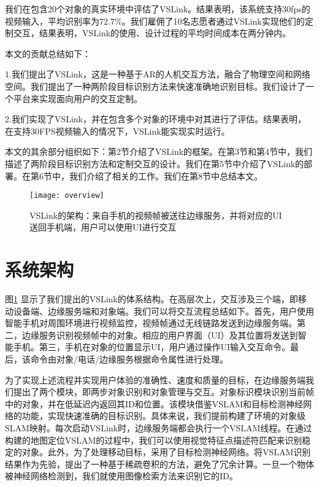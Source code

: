 我们在包含20个对象的真实环境中评估了VSLink。结果表明，该系统支持30fps的视频输入，平均识别率为72.7\%。我们雇佣了10名志愿者通过VSLink实现他们的定制交互，结果表明，VSLink的使用、设计过程的平均时间成本在两分钟内。

本文的贡献总结如下：

1.我们提出了VSLink，这是一种基于AR的人机交互方法，融合了物理空间和网络空间。我们提出了一种两阶段目标识别方法来快速准确地识别目标。我们设计了一个平台来实现面向用户的交互定制。

2.我们实现了VSLink，并在包含多个对象的环境中对其进行了评估。结果表明，在支持30FPS视频输入的情况下，VSLink能实现实时运行。

本文的其余部分组织如下：第2节介绍了VSLink的框架。在第3节和第4节中，我们描述了两阶段目标识别方法和定制交互的设计。我们在第5节中介绍了VSLink的部署。在第6节中，我们介绍了相关的工作。我们在第8节中总结本文。

\begin{figure}[t]
	\centering
	\texttt{[image: overview]}
	\caption{VSLink的架构：来自手机的视频帧被送往边缘服务，并将对应的UI送回手机端，用户可以使用UI进行交互}
	\label{fig:overview}
\end{figure}

\chapter{系统架构}


图\ref{fig:overview} 显示了我们提出的VSLink的体系结构。在高层次上，交互涉及三个端，即移动设备端、边缘服务端和对象端。我们可以将交互流程总结如下。首先，用户使用智能手机对周围环境进行视频监控，视频帧通过无线链路发送到边缘服务端。第二，边缘服务识别视频帧中的对象。相应的用户界面（UI）及其位置将发送到智能手机。第三，手机在对象的位置显示UI，用户通过操作UI输入交互命令。最后，该命令由对象/电话/边缘服务根据命令属性进行处理。

为了实现上述流程并实现用户体验的准确性、速度和质量的目标，在边缘服务端我们提出了两个模块，即两步对象识别和对象管理与交互。对象标识模块识别当前帧中的对象，并在低延迟内返回其ID和位置。该模块借鉴VSLAM和目标检测神经网络的功能，实现快速准确的目标识别。具体来说，我们提前构建了环境的对象级SLAM映射。每次启动VSLink时，边缘服务端都会执行一个VSLAM线程。在通过构建的地图定位VSLAM的过程中，我们可以使用视觉特征点描述符匹配来识别稳定的对象。此外，为了处理移动目标，采用了目标检测神经网络。将VSLAM识别结果作为先验，提出了一种基于稀疏卷积的方法，避免了冗余计算。一旦一个物体被神经网络检测到，我们就使用图像检索方法来识别它的ID。


